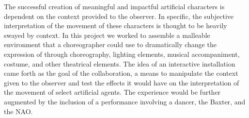 \documentclass[arts,article,submit,moreauthors,pdftex,10pt,a4paper]{mdpi}
\begin{document}
 
 The successful creation of meaningful and impactful artificial characters is dependent on the context provided to the observer. In specific, the subjective interpretation of the movement of these characters is thought to be heavily swayed by context. %
In this project we worked to assemble a malleable environment that a choreographer could use to dramatically change the expression of through choreography, lighting elements, musical accompaniment, costume, and other theatrical elements.
The idea of an interactive installation came forth as the goal of the collaboration, a means to manipulate the context given to the observer and test the effects it would have on the interpretation of the movement of select artificial agents. The experience would be further augmented by the inclusion of a performance involving a dancer, the Baxter, and the NAO. 
\end{document}
